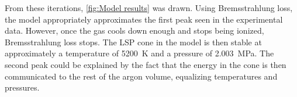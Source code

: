          From these iterations, \autoref{fig:Model results} was drawn. Using Bremsstrahlung loss, the model appropriately approximates the first peak seen in the experimental data. However, once the gas cools down enough and stops being ionized, Bremsstrahlung loss stops. The LSP cone in the model is then stable at approximately a temperature of \qty{5200}{K} and a pressure of \qty{2.003}{MPa}. The second peak could be explained by the fact that the energy in the cone is then communicated to the rest of the argon volume, equalizing temperatures and pressures.
